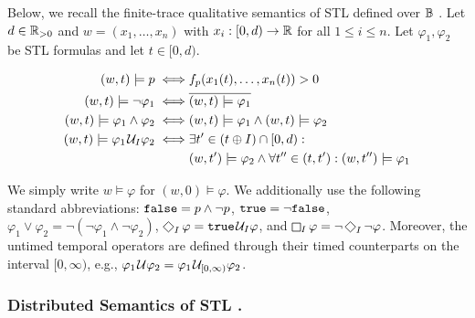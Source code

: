 Below, we recall the finite-trace qualitative semantics of STL defined over $\mathbb{B}$ \cite{MalerN13}.
Let $d \in \mathbb{R}_{> 0}$ and $w = (x_1, \ldots, x_n)$ with $x_i : [0,d) \to \mathbb{R}$ for all $1 \leq i \leq n$.
Let $\varphi_1, \varphi_2$ be STL formulas and let $t \in [0,d)$.

\small
\begin{align*}
	(w,t) \models p \iff & f_p(x_1(t), \ldots, x_n(t)) > 0 \\
	(w,t) \models \lnot \varphi_1 \iff & \overline{(w,t) \models \varphi_1} \\
	(w,t) \models \varphi_1 \land \varphi_2 \iff & (w,t) \models \varphi_1 \land (w,t) \models \varphi_2 \\
	(w,t) \models \varphi_1 \kern.1em\mathcal{U}_I \varphi_2 \iff & \exists t' \in (t \oplus I) \cap [0,d) :  \\
	& (w,t') \models \varphi_2 \land \forall t'' \in (t, t') : (w,t'') \models \varphi_1
\end{align*}
\normalsize

We simply write $w \models \varphi$ for $(w,0) \models \varphi$.
We additionally use the following standard abbreviations: 
$\texttt{false} = p \land \lnot p$,
$\texttt{true} = \lnot \texttt{false}$,
$ \varphi_1 \lor \varphi_2 = \lnot (\lnot \varphi_1 \land \lnot \varphi_2)$,
$\LTLf_I \varphi = \true \until_I \varphi$, and
$\LTLg_I \varphi = \lnot \LTLf_I \lnot \varphi$.
Moreover, the untimed temporal operators are defined through their timed counterparts on the interval $[0,\infty)$, e.g., $\varphi_1 \kern.1em\mathcal{U} \varphi_2 = \varphi_1 \kern.1em\mathcal{U}_{[0,\infty)} \varphi_2$.



\subsubsection{Distributed Semantics of STL \cite{MomtazAB23}.} \label{sec:diststl}

